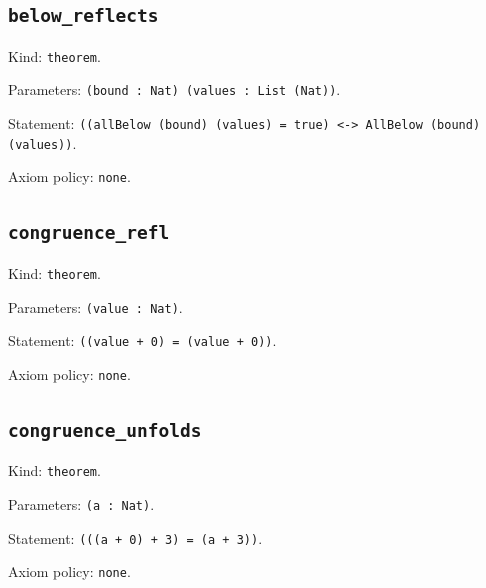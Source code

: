 \documentclass[11pt]{article}
\begin{document}
\subsection*{\texttt{below\_reflects}}
\noindent Kind: \texttt{theorem}.\par
\noindent Parameters: \texttt{(bound : Nat) (values : List (Nat))}.\par
\noindent Statement: \texttt{((allBelow (bound) (values) = true) <-> AllBelow (bound) (values))}.\par
\noindent Axiom policy: \texttt{none}.\par
\subsection*{\texttt{congruence\_refl}}
\noindent Kind: \texttt{theorem}.\par
\noindent Parameters: \texttt{(value : Nat)}.\par
\noindent Statement: \texttt{((value + 0) = (value + 0))}.\par
\noindent Axiom policy: \texttt{none}.\par
\subsection*{\texttt{congruence\_unfolds}}
\noindent Kind: \texttt{theorem}.\par
\noindent Parameters: \texttt{(a : Nat)}.\par
\noindent Statement: \texttt{(((a + 0) + 3) = (a + 3))}.\par
\noindent Axiom policy: \texttt{none}.\par
\end{document}
